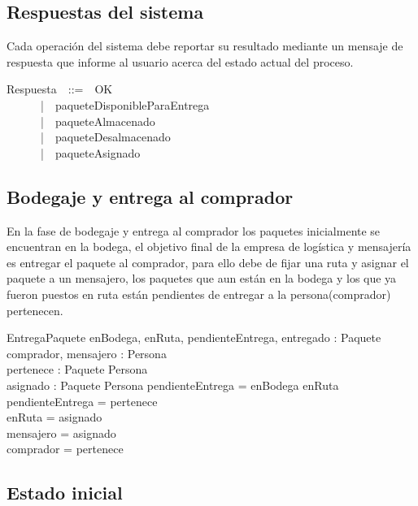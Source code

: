 \documentclass[12pt,a4paper]{article}
\begin{document}
\begin{zed}
\end{zed}

\subsection{Respuestas del sistema}

Cada operación del sistema debe reportar su resultado mediante un mensaje de respuesta que informe al usuario acerca del estado actual del proceso.

\begin{zed}
Respuesta~~::=~~OK\\
~~~~~~|~~paqueteDisponibleParaEntrega\\
~~~~~~|~~paqueteAlmacenado\\
~~~~~~|~~paqueteDesalmacenado\\
~~~~~~|~~paqueteAsignado\\
\end{zed}

\newpage
\subsection{Bodegaje y entrega al comprador}

En la fase de bodegaje y entrega al comprador los paquetes inicialmente se encuentran en la bodega, el objetivo final de la empresa de logística y mensajería es entregar el paquete al comprador, para ello debe de fijar una ruta y asignar el paquete a un mensajero, los paquetes que aun están en la bodega y los que ya fueron puestos en ruta están pendientes de entregar a la persona(comprador) pertenecen.

\begin{schema}{EntregaPaquete}
enBodega, enRuta, pendienteEntrega, entregado : \power Paquete\\
comprador, mensajero : \power Persona\\
pertenece : Paquete \pfun Persona\\
asignado : Paquete \pfun Persona
\where
pendienteEntrega = enBodega \cup enRuta \\
pendienteEntrega = \dom pertenece \\
enRuta = \dom asignado\\
mensajero = \ran asignado\\
comprador = \ran pertenece
\end{schema}

\subsection{Estado inicial}
\end{document}
